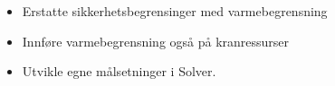 
\begin{itemize}
\item Erstatte sikkerhetsbegrensinger med varmebegrensning
\item Innføre varmebegrensning også på kranressurser
\item Utvikle egne målsetninger i Solver.
\end{itemize}